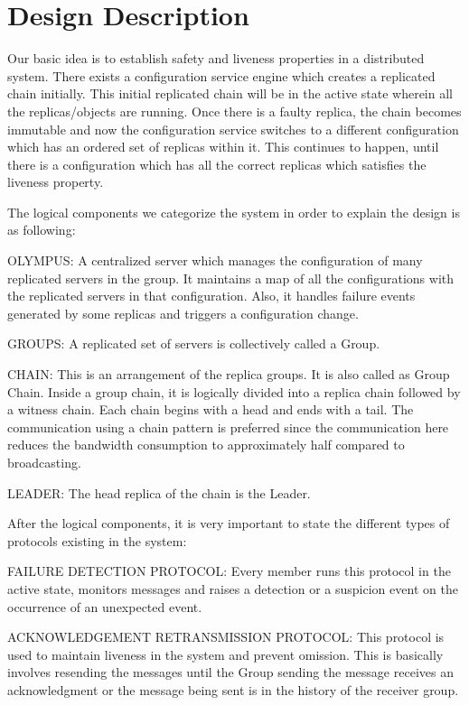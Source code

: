 \documentclass[letterpaper, 10 pt, conference]{ieeeconf}  %
\begin{document}

\section{Design Description}
Our basic idea is to establish safety and liveness properties in a distributed system. There exists a configuration service engine which creates a replicated chain initially. This initial replicated chain will be in the active state wherein all the replicas/objects are running. Once there is a faulty replica, the chain becomes immutable and now the configuration service switches to a different configuration which has an ordered set of replicas within it. This continues to happen, until there is a configuration which has all the correct replicas which satisfies the liveness property.

The logical components we categorize the system in order to explain the design is as following:\smallskip

OLYMPUS: A centralized server which manages the configuration of many replicated servers in the group. It maintains a map of all the configurations with the replicated servers in that configuration. Also, it handles failure events generated by some replicas and triggers a configuration change.\smallskip

GROUPS: A replicated set of servers is collectively called a Group. \smallskip

CHAIN: This is an arrangement of the replica groups. It is also called as Group Chain. Inside a group chain, it is logically divided into a replica chain followed by a witness chain. Each chain begins with a head and ends with a tail.
The communication using a chain pattern is preferred since the communication here reduces the bandwidth consumption to approximately half compared to broadcasting.\smallskip

LEADER: The head replica of the chain is the Leader.\smallskip

After the logical components, it is very important to state the different types of protocols existing in the system:\smallskip

FAILURE DETECTION PROTOCOL: Every member runs this protocol in the active state, monitors messages and raises a detection or a suspicion event on the occurrence of an unexpected event.\smallskip

ACKNOWLEDGEMENT RETRANSMISSION PROTOCOL: This protocol is used to maintain liveness in the system and prevent omission. This is basically involves resending the messages until the Group sending the message receives an acknowledgment or the message being sent is in the history of the receiver group. \smallskip
\end{document}
